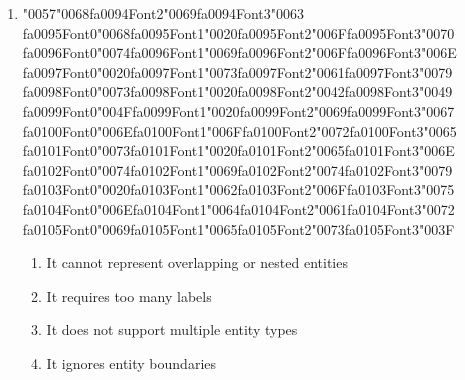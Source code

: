 \documentclass[12pt]{article}
\begin{document}
\begin{enumerate}[label=Q\arabic*.]
\item {\char"0057}{\char"0068}{\csname fa0094Font2\endcsname\char"0069}{\csname fa0094Font3\endcsname\char"0063} {\csname fa0095Font0\endcsname\char"0068}{\csname fa0095Font1\endcsname\char"0020}{\csname fa0095Font2\endcsname\char"006F}{\csname fa0095Font3\endcsname\char"0070} {\csname fa0096Font0\endcsname\char"0074}{\csname fa0096Font1\endcsname\char"0069}{\csname fa0096Font2\endcsname\char"006F}{\csname fa0096Font3\endcsname\char"006E} {\csname fa0097Font0\endcsname\char"0020}{\csname fa0097Font1\endcsname\char"0073}{\csname fa0097Font2\endcsname\char"0061}{\csname fa0097Font3\endcsname\char"0079} {\csname fa0098Font0\endcsname\char"0073}{\csname fa0098Font1\endcsname\char"0020}{\csname fa0098Font2\endcsname\char"0042}{\csname fa0098Font3\endcsname\char"0049} {\csname fa0099Font0\endcsname\char"004F}{\csname fa0099Font1\endcsname\char"0020}{\csname fa0099Font2\endcsname\char"0069}{\csname fa0099Font3\endcsname\char"0067} {\csname fa0100Font0\endcsname\char"006E}{\csname fa0100Font1\endcsname\char"006F}{\csname fa0100Font2\endcsname\char"0072}{\csname fa0100Font3\endcsname\char"0065} {\csname fa0101Font0\endcsname\char"0073}{\csname fa0101Font1\endcsname\char"0020}{\csname fa0101Font2\endcsname\char"0065}{\csname fa0101Font3\endcsname\char"006E} {\csname fa0102Font0\endcsname\char"0074}{\csname fa0102Font1\endcsname\char"0069}{\csname fa0102Font2\endcsname\char"0074}{\csname fa0102Font3\endcsname\char"0079} {\csname fa0103Font0\endcsname\char"0020}{\csname fa0103Font1\endcsname\char"0062}{\csname fa0103Font2\endcsname\char"006F}{\csname fa0103Font3\endcsname\char"0075} {\csname fa0104Font0\endcsname\char"006E}{\csname fa0104Font1\endcsname\char"0064}{\csname fa0104Font2\endcsname\char"0061}{\csname fa0104Font3\endcsname\char"0072} {\csname fa0105Font0\endcsname\char"0069}{\csname fa0105Font1\endcsname\char"0065}{\csname fa0105Font2\endcsname\char"0073}{\csname fa0105Font3\endcsname\char"003F}
\begin{enumerate}[label=(\Alph*)]
    \item It cannot represent overlapping or nested entities
    \item It requires too many labels
    \item It does not support multiple entity types
    \item It ignores entity boundaries
\end{enumerate}

\end{enumerate}
\end{document}
